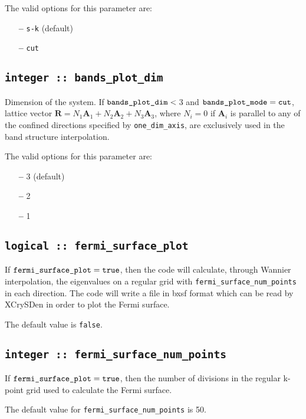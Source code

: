 The valid options for this parameter are:
\begin{itemize}
\item[{\bf --}] \verb#s-k# (default)
\item[{\bf --}] \verb#cut#
\end{itemize}

\subsection[bands\_plot\_dim]{\tt integer :: bands\_plot\_dim}

Dimension of the system.
If $\verb#bands_plot_dim#<\:$3 and $\verb#bands_plot_mode#=\verb#cut#$,
lattice vector $\mathbf{R}=N_1 \mathbf{A}_{1} + N_2 \mathbf{A}_{2} + N_3 \mathbf{A}_3$,
where $N_i=0$ if $\mathbf{A}_i$ is parallel to any of the
confined directions specified by \verb#one_dim_axis#,
are exclusively used in the band structure interpolation.

The valid options for this parameter are:
\begin{itemize}
\item[{\bf --}] 3 (default)
\item[{\bf --}] 2
\item[{\bf --}] 1
\end{itemize}


\subsection[fermi\_surface\_plot]{\tt logical :: fermi\_surface\_plot}

If $\verb#fermi_surface_plot#=\verb#true#$, then the code will calculate,
through Wannier interpolation, the
eigenvalues on a regular grid with \verb#fermi_surface_num_points# in
each direction. The code will write a file in bxsf format which can be
read by XCrySDen in order to plot the Fermi surface.

The default value is \verb#false#.


\subsection[fermi\_surface\_num\_points]{\tt integer :: fermi\_surface\_num\_points}

If $\verb#fermi_surface_plot#=\verb#true#$, then the number of divisions in
the regular k-point grid used to calculate the Fermi surface.

The default value for \verb#fermi_surface_num_points# is 50.


